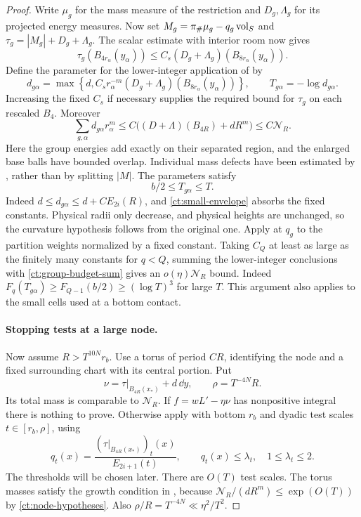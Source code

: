 \begin{proof}
Write $\mu_g$ for the mass measure of the restriction and $D_g,\Lambda_g$
for its projected energy measures. Now set
$M_g=\pi_\#\mu_g-q_g\operatorname{vol}_S$ and $\tau_g=|M_g|+D_g+\Lambda_g$.
The scalar estimate with interior
room now gives
\[
 \tau_g(B_{4r_\alpha}(y_\alpha))
 \le C_s(D_g+\Lambda_g)(B_{8r_\alpha}(y_\alpha)).
\]
Define the parameter for the lower-integer application of  by
\begin{equation}\label{ct:group-budget}
 d_{g\alpha}=\max\left\{d,
 C_s r_\alpha^{-m}(D_g+\Lambda_g)
                  (B_{8r_\alpha}(y_\alpha))\right\},
 \qquad T_{g\alpha}=-\log d_{g\alpha}.
\end{equation}
Increasing the fixed $C_s$ if necessary supplies the required bound
for $\tau_g$ on each rescaled $B_4$.  Moreover
\begin{equation}\label{ct:group-budget-sum}
 \sum_{g,\alpha}d_{g\alpha}r_\alpha^m
 \le C\bigl((D+\Lambda)(B_{4R})+dR^m\bigr)
 \le C\mathcal N_R.
\end{equation}
Here the group energies add exactly on their separated region, and
the enlarged base balls have bounded overlap.  Individual mass defects
have been estimated by , rather than by splitting
$|M|$.  The parameters satisfy
\begin{equation}\label{ct:child-parameter}
 b/2\le T_{g\alpha}\le T.
\end{equation}
Indeed $d\le d_{g\alpha}\le d+C E_{2i}(R)$, and
\eqref{ct:small-envelope} absorbs the fixed constants.  Physical
radii only decrease, and physical heights are unchanged, so the
curvature hypothesis follows from the original one.  Apply
 at $q_g$ to the partition weights normalized by a
fixed constant.
Taking $C_Q$ at
least as large as the finitely many constants for $q<Q$, summing the
lower-integer conclusions with \eqref{ct:group-budget-sum} gives an
$o(\eta)\mathcal N_R$ bound.  Indeed
$F_q(T_{g\alpha})\ge F_{Q-1}(b/2)\ge(\log T)^3$ for large $T$.
This argument also applies to the small cells used at a bottom contact.

\paragraph{Stopping tests at a large node.}
Now assume $R>T^{10N}r_b$.  Use a torus of period $C R$, identifying
the node and a fixed surrounding chart with its central portion.  Put
\[
 \nu=\tau|_{B_{4R}(x_*)}+d\,\dd y,
 \qquad \rho=T^{-4N}R.
\]
Its total mass is comparable to $\mathcal N_R$.  If
$f=wL'-\eta\nu$ has nonpositive integral there is nothing to prove.
Otherwise apply  with bottom $r_b$ and dyadic test
scales $t\in[r_b,\rho]$, using
\begin{equation}\label{ct:stopping-q}
 q_t(x)=\frac{(\tau|_{B_{4R}(x_*)})_t(x)}{E_{2i+1}(t)},
 \qquad q_t(x)\le\lambda_t,\quad 1\le\lambda_t\le2.
\end{equation}
The thresholds will be chosen later.  There are $O(T)$ test scales.
The torus masses satisfy the growth condition in
, because
$\mathcal N_R/(dR^m)\le\exp(O(T))$ by
\eqref{ct:node-hypotheses}.  Also
$\rho/R=T^{-4N}\ll\eta^2/T^2$.


\end{proof}
